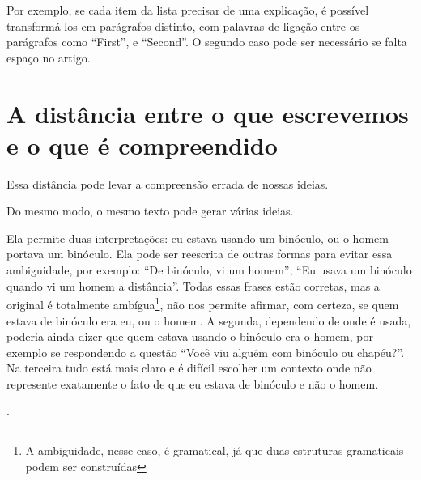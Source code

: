 \documentclass[openany]{book}
\begin{document}
   Por exemplo, se cada item da lista precisar de uma explicação, é possível transformá-los em parágrafos distinto, com palavras de ligação entre os parágrafos como ``First'', e ``Second''. O segundo caso pode ser necessário se falta espaço no artigo.

\section{A distância entre o que escrevemos e o que é compreendido}

 Essa distância pode levar a compreensão errada de nossas ideias.

 Do mesmo modo, o mesmo texto pode gerar várias ideias.

Ela permite duas interpretações: eu estava usando um binóculo, ou o homem portava um binóculo. Ela pode ser reescrita de outras formas para evitar essa ambiguidade, por exemplo: \enquote{De binóculo, vi um homem}, \enquote{Eu usava um binóculo quando vi um homem a distância}. Todas essas frases estão corretas, mas a original é totalmente ambígua\footnote{A ambiguidade, nesse caso, é gramatical, já que duas estruturas gramaticais podem ser construídas}, não nos permite afirmar, com certeza, se quem estava de binóculo era eu, ou o homem. A segunda, dependendo de onde é usada, poderia ainda dizer que quem estava usando o binóculo era o homem, por exemplo se respondendo a questão ``Você viu alguém com binóculo ou chapéu?''.
Na terceira tudo está mais claro e é difícil escolher um contexto onde não represente exatamente o fato de que eu estava de binóculo e não o homem.

.
\end{document}

